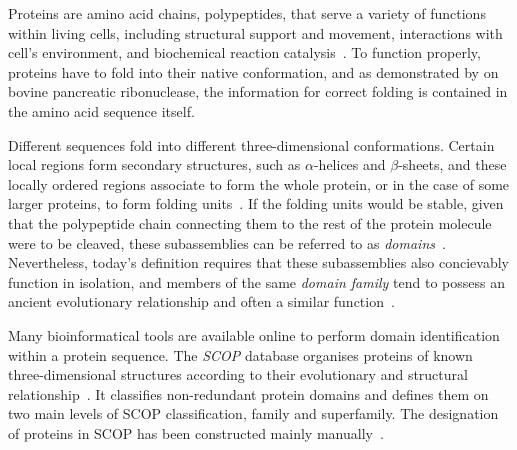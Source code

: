 \label{intro}

\label{intro:prodoms}

  Proteins are amino acid chains, polypeptides, that serve a variety of functions within
  living cells, including structural support and movement, interactions with cell's
  environment, and biochemical reaction catalysis~\cite{alberts2018molecular}.
  To function properly, proteins have to fold into their native conformation, and as
  demonstrated by \citet{anfinsen1961kinetics} on bovine pancreatic ribonuclease, the
  information for correct folding is contained in the amino acid sequence itself.

  Different sequences fold into different three-dimensional conformations.
  Certain local regions form secondary structures, such as $\alpha$-helices and
  $\beta$-sheets, and these locally ordered regions associate to form the whole protein,
  or in the case of some larger proteins, to form folding units~\cite{levitt1975computer}.
  If the folding units would be stable, given that the polypeptide chain connecting them
  to the rest of the protein molecule were to be cleaved, these subassemblies can be
  referred to as \emph{domains}~\cite{goldberg1969tertiary, levitt1975computer}.
  Nevertheless, today's definition requires that these subassemblies also concievably
  function in isolation, and members of the same \emph{domain family} tend to possess an
  ancient evolutionary relationship and often a similar
  function~\cite{ponting2002natural}.

  Many bioinformatical tools are available online to perform domain identification within
  a protein sequence.
  The \emph{SCOP} database organises proteins of known three-dimensional structures
  according to their evolutionary and structural relationship~\cite{murzin1995scop}.
  It classifies non-redundant protein domains and defines them on two main levels of SCOP
  classification, family and superfamily.
  The designation of proteins in SCOP has been constructed mainly
  manually~\cite{andreeva2020scop}.

